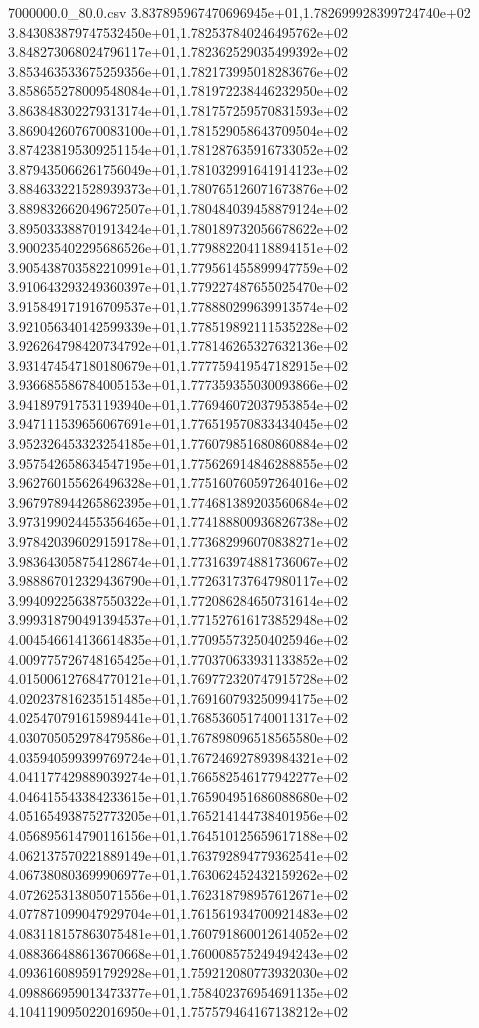\begin{filecontents*}{7000000.0_80.0.csv}
3.837895967470696945e+01,1.782699928399724740e+02
3.843083879747532450e+01,1.782537840246495762e+02
3.848273068024796117e+01,1.782362529035499392e+02
3.853463533675259356e+01,1.782173995018283676e+02
3.858655278009548084e+01,1.781972238446232950e+02
3.863848302279313174e+01,1.781757259570831593e+02
3.869042607670083100e+01,1.781529058643709504e+02
3.874238195309251154e+01,1.781287635916733052e+02
3.879435066261756049e+01,1.781032991641914123e+02
3.884633221528939373e+01,1.780765126071673876e+02
3.889832662049672507e+01,1.780484039458879124e+02
3.895033388701913424e+01,1.780189732056678622e+02
3.900235402295686526e+01,1.779882204118894151e+02
3.905438703582210991e+01,1.779561455899947759e+02
3.910643293249360397e+01,1.779227487655025470e+02
3.915849171916709537e+01,1.778880299639913574e+02
3.921056340142599339e+01,1.778519892111535228e+02
3.926264798420734792e+01,1.778146265327632136e+02
3.931474547180180679e+01,1.777759419547182915e+02
3.936685586784005153e+01,1.777359355030093866e+02
3.941897917531193940e+01,1.776946072037953854e+02
3.947111539656067691e+01,1.776519570833434045e+02
3.952326453323254185e+01,1.776079851680860884e+02
3.957542658634547195e+01,1.775626914846288855e+02
3.962760155626496328e+01,1.775160760597264016e+02
3.967978944265862395e+01,1.774681389203560684e+02
3.973199024455356465e+01,1.774188800936826738e+02
3.978420396029159178e+01,1.773682996070838271e+02
3.983643058754128674e+01,1.773163974881736067e+02
3.988867012329436790e+01,1.772631737647980117e+02
3.994092256387550322e+01,1.772086284650731614e+02
3.999318790491394537e+01,1.771527616173852948e+02
4.004546614136614835e+01,1.770955732504025946e+02
4.009775726748165425e+01,1.770370633931133852e+02
4.015006127684770121e+01,1.769772320747915728e+02
4.020237816235151485e+01,1.769160793250994175e+02
4.025470791615989441e+01,1.768536051740011317e+02
4.030705052978479586e+01,1.767898096518565580e+02
4.035940599399769724e+01,1.767246927893984321e+02
4.041177429889039274e+01,1.766582546177942277e+02
4.046415543384233615e+01,1.765904951686088680e+02
4.051654938752773205e+01,1.765214144738401956e+02
4.056895614790116156e+01,1.764510125659617188e+02
4.062137570221889149e+01,1.763792894779362541e+02
4.067380803699906977e+01,1.763062452432159262e+02
4.072625313805071556e+01,1.762318798957612671e+02
4.077871099047929704e+01,1.761561934700921483e+02
4.083118157863075481e+01,1.760791860012614052e+02
4.088366488613670668e+01,1.760008575249494243e+02
4.093616089591792928e+01,1.759212080773932030e+02
4.098866959013473377e+01,1.758402376954691135e+02
4.104119095022016950e+01,1.757579464167138212e+02

\end{filecontents*}
